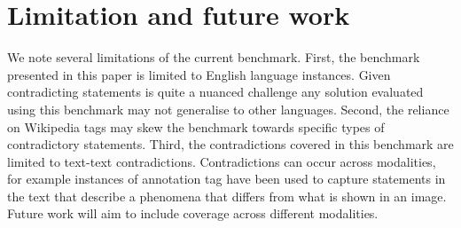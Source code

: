 \section{Limitation and future work} 
\label{sec:limit}
We note several limitations of the current benchmark. First, the benchmark presented in this paper is limited to English language instances. Given contradicting statements is quite a nuanced challenge any solution evaluated using this benchmark may not generalise to other languages. Second, the reliance on Wikipedia tags may skew the benchmark towards specific types of contradictory statements. Third, the contradictions covered in this benchmark are limited to text-text contradictions. Contradictions can occur across modalities, for example instances of annotation tag have been used to capture statements in the text that describe a phenomena that differs from what is shown in an image. Future work will aim to include coverage across different modalities. 

